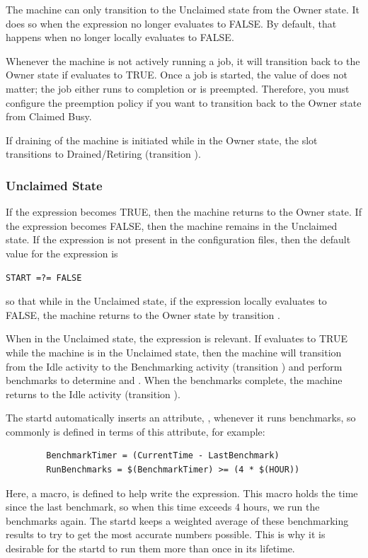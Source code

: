 The machine can only transition to the Unclaimed state from the Owner
state. It does so when the  expression no longer
evaluates to FALSE.  By default, that happens when  no longer
locally evaluates to FALSE.

Whenever the machine is not actively running a job, it will transition
back to the Owner state if  evaluates to TRUE.  Once a
job is started, the value of  does not matter; the job
either runs to completion or is preempted.  Therefore, you must
configure the preemption policy if you want to transition back to the
Owner state from Claimed Busy.

If draining of the machine is initiated while in the Owner state, the
slot transitions to Drained/Retiring (transition ).

\subsubsection{\label{sec:Unclaimed-State}Unclaimed State}

If the  expression becomes TRUE, then the machine returns
to the Owner state.
If the  expression becomes FALSE, then the machine remains
in the Unclaimed state.
If the  expression is not present in the configuration files,
then the default value for the  expression is 
\begin{verbatim}
START =?= FALSE
\end{verbatim}
so that
while in the Unclaimed state, if the  expression locally
evaluates to FALSE, the machine returns to the Owner state by
transition .

When in the Unclaimed state,
the 
expression is relevant.
If  evaluates to TRUE while the machine
is in the Unclaimed state,
then the machine will transition from the Idle
activity to the Benchmarking activity (transition ) and
perform benchmarks to determine  and .  
When the benchmarks complete, the machine returns to the Idle activity
(transition ).

The startd automatically inserts an attribute, ,
whenever it runs benchmarks, so commonly  is
defined in terms of this attribute, for example:
\begin{verbatim}
        BenchmarkTimer = (CurrentTime - LastBenchmark)
        RunBenchmarks = $(BenchmarkTimer) >= (4 * $(HOUR))
\end{verbatim}
Here, a macro,  is defined to help write the
expression.
This macro holds the time since the last benchmark,
so when this time exceeds 4 hours, we run the benchmarks again.
The startd keeps a weighted average of these benchmarking
results to try to get the most accurate numbers possible.
This is why
it is desirable for 
the startd to run them more than once in its lifetime.

